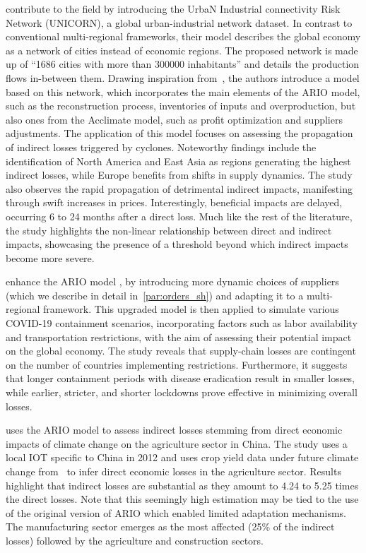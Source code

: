 \Textcite{shughrue-2020-global-spread, shughrue-2018-system-vulner} contribute to the field by
introducing the UrbaN Industrial connectivity Risk Network (UNICORN), a global
urban-industrial network dataset. In contrast to conventional multi-regional
frameworks, their model describes the global economy as a network of cities
instead of economic regions. The proposed network is made up of ``1686 cities with more
than 300000 inhabitants'' and details the production flows in-between them.
Drawing inspiration from~\textcite{wenz-2016-enhan-econom,
  hallegatte-2013-model-role}, the authors introduce a model
based on this network, which incorporates the main elements of the ARIO model,
such as the reconstruction process, inventories of inputs and overproduction,
but also ones from the Acclimate model, such as profit optimization and
suppliers adjustments. The application of this model focuses on assessing the
propagation of indirect losses triggered by cyclones. Noteworthy findings
include the identification of North America and East Asia as regions generating
the highest indirect losses, while Europe benefits from shifts in supply
dynamics. The study also observes the rapid propagation of detrimental indirect
impacts, manifesting through swift increases in prices. Interestingly,
beneficial impacts are delayed, occurring 6 to 24 months after a direct loss.
Much like the rest of the literature, the study highlights the non-linear
relationship between direct and indirect impacts, showcasing the presence of a
threshold beyond which indirect impacts become more severe.

\Textcite{guan-2020-global-suppl} enhance the ARIO
model \parencite[version from][]{hallegatte-2013-model-role}, by
introducing more dynamic choices of suppliers (which we describe in detail
in~\cref{par:orders_sh}) and adapting it to a multi-regional framework. This
upgraded model is then applied to simulate various COVID-19 containment
scenarios, incorporating factors such as labor availability and transportation
restrictions, with the aim of assessing their potential impact on the global
economy. The study reveals that supply-chain losses are contingent on the number
of countries implementing restrictions. Furthermore, it suggests that longer
containment periods with disease eradication result in smaller losses, while
earlier, stricter, and shorter lockdowns prove effective in minimizing overall
losses.

\Textcite{huang-2020-asses-econom} uses the ARIO model \parencite[version
from][]{hallegatte-2008-adapt-region} to assess indirect losses
stemming from direct economic impacts of climate change on the agriculture sector in
China. The study uses a local IOT specific to China in 2012 and uses crop yield
data under future climate change from~\textcite{liu-2020-centr-trend} to infer
direct economic losses in the agriculture sector. Results highlight that
indirect losses are substantial as they amount to 4.24 to 5.25 times the direct
losses. Note that this seemingly high estimation may be tied to the use of the
original version of ARIO which enabled limited adaptation mechanisms.
The manufacturing sector emerges as the most affected (25\% of the indirect
losses) followed by the agriculture and construction sectors.

